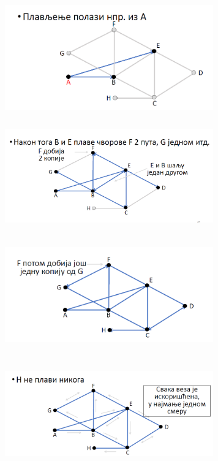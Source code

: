 \documentclass{article} %
\begin{document}
\begin{center}
		\includegraphics[width=9cm, height=5cm]{plavljenje1}\\
		\vskip 10mm
		\includegraphics[width=9cm, height=5cm]{plavljenje2}\\
		\vskip 10mm
		\includegraphics[width=9cm, height=5cm]{plavljenje3}\\
		\vskip 10mm
		\includegraphics[width=9cm, height=5cm]{plavljenje4}\\
		\vskip 10mm
		
\end{center}
\end{document}
